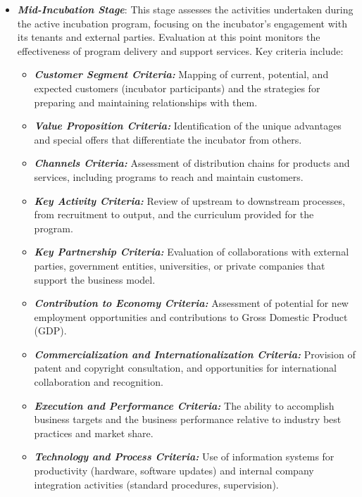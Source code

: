 \documentclass[../Main.tex]{subfiles}
\begin{document}
\begin{itemize}
    \item \emph{\textbf{Mid-Incubation Stage}}: This stage assesses the activities undertaken during the active incubation program, focusing on the incubator's engagement with its tenants and external parties. Evaluation at this point monitors the effectiveness of program delivery and support services. Key criteria include:
          \begin{itemize}
              \item \emph{\textbf{Customer Segment Criteria:}} Mapping of current, potential, and expected customers (incubator participants) and the strategies for preparing and maintaining relationships with them.
              \item \emph{\textbf{Value Proposition Criteria:}} Identification of the unique advantages and special offers that differentiate the incubator from others.
              \item \emph{\textbf{Channels Criteria:}} Assessment of distribution chains for products and services, including programs to reach and maintain customers.
              \item \emph{\textbf{Key Activity Criteria:}} Review of upstream to downstream processes, from recruitment to output, and the curriculum provided for the program.
              \item \emph{\textbf{Key Partnership Criteria:}} Evaluation of collaborations with external parties, government entities, universities, or private companies that support the business model.
              \item \emph{\textbf{Contribution to Economy Criteria:}} Assessment of potential for new employment opportunities and contributions to Gross Domestic Product (GDP).
              \item \emph{\textbf{Commercialization and Internationalization Criteria:}} Provision of patent and copyright consultation, and opportunities for international collaboration and recognition.
              \item \emph{\textbf{Execution and Performance Criteria:}} The ability to accomplish business targets and the business performance relative to industry best practices and market share.
              \item \emph{\textbf{Technology and Process Criteria:}} Use of information systems for productivity (hardware, software updates) and internal company integration activities (standard procedures, supervision).
          \end{itemize}


\end{itemize}
\end{document}
